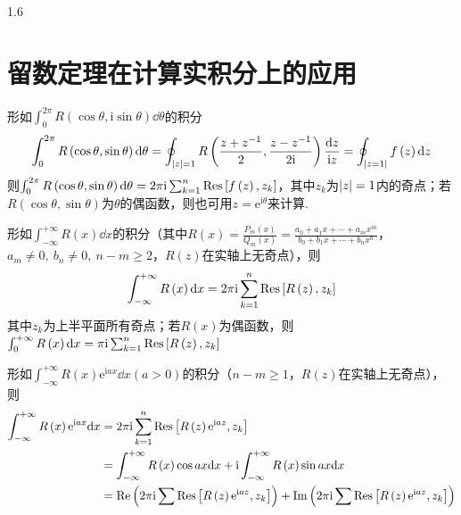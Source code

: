 \documentclass[lang=cn,10pt]{elegantbook}
\renewcommand{\i}{\mathrm{i}}
\begin{document}
\begin{spacing}{1.6}
\section{留数定理在计算实积分上的应用}
\begin{example}
形如$\int_0^{2\pi}{R\left(\cos\theta,\i\sin\theta\right)\dd\theta}$的积分
    $$\int_0^{2\pi}{R\left(\cos\theta,\sin\theta\right)\dd\theta}=\oint_{\abs{z}=1}{R\left(\frac{z+z^{-1}}{2},\frac{z-z^{-1}}{2\i}\right)\frac{\dd z}{\i z}}=\oint_{\abs{z=1}}{f\left(z\right)\dd z}$$
    则$\int_0^{2\pi}{R\left(\cos\theta,\sin\theta\right)\dd\theta}=2\pi\i\sum_{k=1}^n{\Res\left[f\left(z\right),z_k\right]}$，其中$z_k$为$\abs{z}=1$内的奇点；若$R\left(\cos\theta,\sin\theta\right)$为$\theta$的偶函数，则也可用$z=\mathrm{e}^{\i\theta}$来计算.
\end{example}
\begin{example}
形如$\int_{-\infty}^{+\infty}{R\left(x\right)\dd x}$的积分（其中$R\left(x\right)=\frac{P_m\left(x\right)}{Q_m\left(x\right)}=\frac{a_0+a_1x+\cdots+a_mx^m}{b_0+b_1x+\cdots+b_nx^n}$，$a_m\neq 0,\ b_n\neq 0,\ n-m\geq 2$，$R\left(z\right)$在实轴上无奇点），则
    $$\int_{-\infty}^{+\infty}{R\left(x\right)\dd x}=2\pi\i\sum_{k=1}^n{\Res\left[R\left(z\right),z_k\right]}$$
    其中$z_k$为上半平面所有奇点；若$R\left(x\right)$为偶函数，则$\int_0^{+\infty}{R\left(x\right)\dd x}=\pi\i\sum_{k=1}^n{\Res\left[R\left(z\right),z_k\right]}$
\end{example}
\begin{example}
形如$\int_{-\infty}^{+\infty}{R\left(x\right)\mathrm{e}^{\i ax}\dd x}(a>0)$的积分（$n-m\geq 1$，$R\left(z\right)$在实轴上无奇点），则
    $$
    \begin{aligned}
    \int_{-\infty}^{+\infty}{R\left(x\right)\mathrm{e}^{\i ax}\dd x}&=2\pi\i\sum_{k=1}^n{\Res\left[R\left(z\right)\mathrm{e}^{\i az},z_k\right]}\\
    &=\int_{-\infty}^{+\infty}{R\left(x\right)\cos ax\dd x}+\i\int_{-\infty}^{+\infty}{R\left(x\right)\sin ax\dd x}\\
    &=\Re\left(2\pi\i\sum\Res\left[R\left(z\right)\mathrm{e}^{\i az},z_k\right]\right)+\Im\left(2\pi\i\sum\Res\left[R\left(z\right)\mathrm{e}^{\i az},z_k\right]\right)
    \end{aligned}
    $$
\end{example}
\end{spacing}
\end{document}
